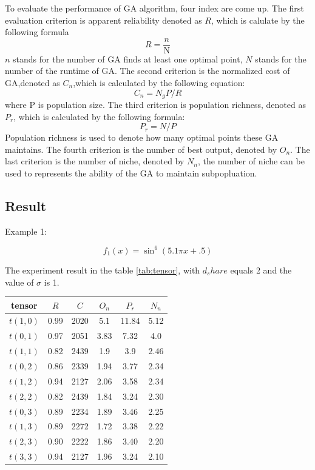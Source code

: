 \documentclass[smallextended]{svjour3}       %
\begin{document}
\begin{multicols}{2}
To evaluate the performance of GA algorithm, four index are come up. The first
evaluation criterion is apparent reliability denoted as $R$, which is calulate
by the following formula
\begin{equation}
R = \frac{n}{\text{N}}
\end{equation}
$n$ stands for the number of GA finds at least one optimal point, $N$ stands for
the number of the runtime of GA.
The second criterion is the normalized cost of GA,denoted as $C_n$,which is
calculated by the following equation:
\begin{equation}
C_{n} = N_{g}P/R
\end{equation}
where P is population size.  The third criterion is population richness, denoted
as $P_{r}$, which is calculated by the following formula:
$$
P_{r} = N/P
$$
Population richness is used to denote how many optimal points these GA
maintains.  The fourth criterion is the number of best output, denoted by
$O_{n}$.  The last criterion is the number of niche, denoted by $N_{n}$, the
number of niche can be used to represents the ability of the GA to maintain
subpopluation.


\subsection{Result}
Example 1:

\begin{equation}
f_{1}(x)=\sin^{6}(5.1 \pi x+.5)
\end{equation}

The experiment result in the table \ref{tab:tensor}, with $d_share$ equals 2 and the value of $\sigma$ 
is 1.

\begin{center}
\begin{tabular}{cccccc}
	\toprule
    tensor & $R$ & $C$ & $O_{n}$ & $P_{r}$ & $N_{n}$\\
	\midrule
    $t(1,0)$ & 0.99 & 2020 & 5.1 & 11.84 & 5.12 \\
    $t(0,1)$ & 0.97 & 2051 & 3.83 & 7.32 & 4.0 \\
    $t(1,1)$ & 0.82 & 2439 & 1.9 & 3.9 & 2.46 \\
    $t(0,2)$ & 0.86 & 2339 & 1.94 & 3.77 & 2.34 \\
    $t(1,2)$ & 0.94 & 2127 & 2.06 & 3.58 & 2.34 \\
    $t(2,2)$ & 0.82 & 2439 & 1.84 & 3.24 & 2.30 \\
    $t(0,3)$ & 0.89 & 2234 & 1.89 & 3.46 & 2.25 \\
    $t(1,3)$ & 0.89 & 2272 & 1.72 & 3.38 & 2.22 \\
    $t(2,3)$ & 0.90 & 2222 & 1.86 & 3.40 & 2.20 \\
    $t(3,3)$ & 0.94 & 2127 & 1.96 & 3.24 & 2.10 \\
	\bottomrule
\end{tabular}
\label{tab:tensor}
\end{center}


\end{multicols}
\end{document}
